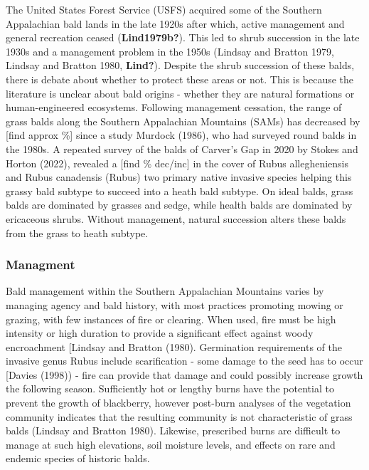 \documentclass[
]{article}
\begin{document}
The United States Forest Service (USFS) acquired some of the Southern Appalachian bald lands in the late 1920s after which, active management and general recreation ceased (\textbf{Lind1979b?}). This led to shrub succession in the late 1930s and a management problem in the 1950s (Lindsay and Bratton 1979, Lindsay and Bratton 1980, \textbf{Lind?}). Despite the shrub succession of these balds, there is debate about whether to protect these areas or not. This is because the literature is unclear about bald origins - whether they are natural formations or human-engineered ecosystems. Following management cessation, the range of grass balds along the Southern Appalachian Mountains (SAMs) has decreased by {[}find approx \%{]} since a study Murdock (1986), who had surveyed round balds in the 1980s. A repeated survey of the balds of Carver's Gap in 2020 by Stokes and Horton (2022), revealed a {[}find \% dec/inc{]} in the cover of Rubus allegheniensis and Rubus canadensis (Rubus) two primary native invasive species helping this grassy bald subtype to succeed into a heath bald subtype. On ideal balds, grass balds are dominated by grasses and sedge, while health balds are dominated by ericaceous shrubs. Without management, natural succession alters these balds from the grass to heath subtype.

\hypertarget{managment}{%
\subsubsection{Managment}\label{managment}}

Bald management within the Southern Appalachian Mountains varies by managing agency and bald history, with most practices promoting mowing or grazing, with few instances of fire or clearing. When used, fire must be high intensity or high duration to provide a significant effect against woody encroachment {[}Lindsay and Bratton (1980). Germination requirements of the invasive genus Rubus include scarification - some damage to the seed has to occur {[}Davies (1998)) - fire can provide that damage and could possibly increase growth the following season. Sufficiently hot or lengthy burns have the potential to prevent the growth of blackberry, however post-burn analyses of the vegetation community indicates that the resulting community is not characteristic of grass balds (Lindsay and Bratton 1980). Likewise, prescribed burns are difficult to manage at such high elevations, soil moisture levels, and effects on rare and endemic species of historic balds.
\end{document}
